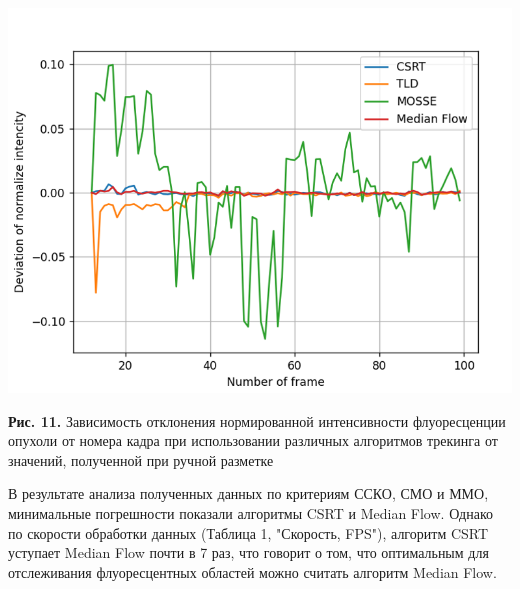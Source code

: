 \documentclass[a4paper,14pt]{extarticle}
\begin{document}
\begin{center}
    \includegraphics[scale = 0.8]{delta.png}
    
    \textbf{Рис. 11.} Зависимость отклонения нормированной интенсивности флуоресценции опухоли от номера кадра при использовании различных алгоритмов трекинга от значений, полученной при ручной разметке 
\end{center}

В результате анализа полученных данных по критериям ССКО, СМО и ММО, минимальные погрешности показали алгоритмы CSRT и Median Flow. Однако по скорости обработки данных (Таблица 1, "Скорость, FPS"), алгоритм CSRT уступает Median Flow почти в 7 раз, что говорит о том, что оптимальным для отслеживания флуоресцентных областей можно считать алгоритм Median Flow.    
\end{document}
